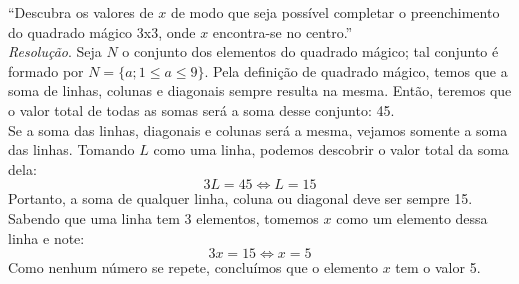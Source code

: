 \enquote{Descubra os valores de $x$ de modo que seja possível completar o preenchimento do quadrado mágico 3x3, onde $x$ encontra-se no centro.} 
    \\ \emph{Resolução}. Seja $N$ o conjunto dos elementos do quadrado mágico; tal conjunto é formado por $N = \{a; 1 \le a \le 9\}$. Pela definição de quadrado mágico, temos que a soma de linhas, colunas e diagonais sempre resulta na mesma. Então, teremos que o valor total de todas as somas será a soma desse conjunto: 45. 
    \\ Se a soma das linhas, diagonais e colunas será a mesma, vejamos somente a soma das linhas. Tomando $L$ como uma linha, podemos descobrir o valor total da soma dela:
    \begin{displaymath}
        3L = 45 \iff L = 15 
    \end{displaymath}
    Portanto, a soma de qualquer linha, coluna ou diagonal deve ser sempre 15. 
    \\ Sabendo que uma linha tem 3 elementos, tomemos $x$ como um elemento dessa linha e note:
    \begin{displaymath}
        3x = 15 \iff x = 5
    \end{displaymath}
    Como nenhum número se repete, concluímos que o elemento $x$ tem o valor 5.